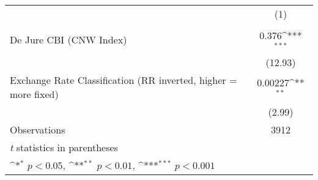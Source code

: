 {
\def\sym#1{\ifmmode^{#1}\else\(^{#1}\)\fi}
\begin{tabular}{l*{1}{c}}
\hline\hline
                &\multicolumn{1}{c}{(1)}\\
                &\multicolumn{1}{c}{}\\
\hline
De Jure CBI (CNW Index)&    0.376\sym{***}\\
                &  (12.93)         \\
[1em]
Exchange Rate Classification (RR inverted, higher = more fixed)&  0.00227\sym{**} \\
                &   (2.99)         \\
\hline
Observations    &     3912         \\
\hline\hline
\multicolumn{2}{l}{\footnotesize \textit{t} statistics in parentheses}\\
\multicolumn{2}{l}{\footnotesize \sym{*} \(p<0.05\), \sym{**} \(p<0.01\), \sym{***} \(p<0.001\)}\\
\end{tabular}
}
